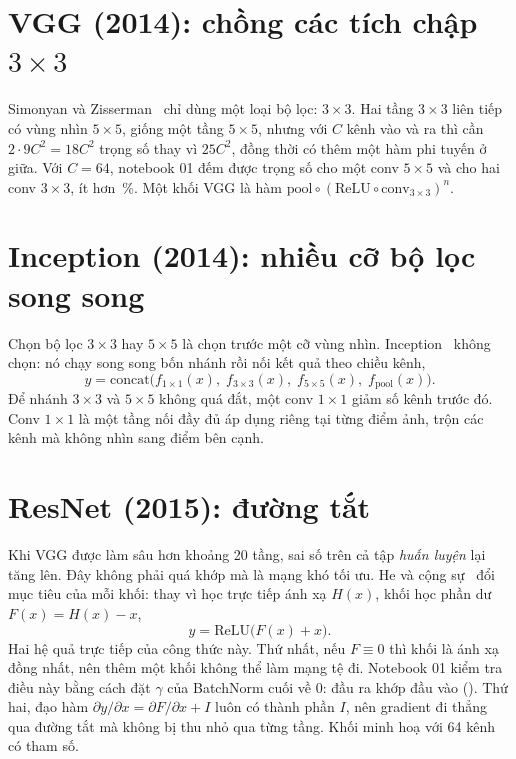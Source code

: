 
\section{VGG (2014): chồng các tích chập $3\times3$}

Simonyan và Zisserman~\cite{simonyan2015} chỉ dùng một loại bộ lọc: $3\times3$. Hai tầng $3\times3$ liên tiếp
có vùng nhìn $5\times5$, giống một tầng $5\times5$, nhưng với $C$ kênh vào và ra thì cần $2\cdot9C^2=18C^2$
trọng số thay vì $25C^2$, đồng thời có thêm một hàm phi tuyến ở giữa. Với $C=64$, notebook 01 đếm được
 trọng số cho một conv $5\times5$ và  cho hai conv $3\times3$,
ít hơn \,\%. Một khối VGG là hàm
$\mathrm{pool}\circ(\mathrm{ReLU}\circ\mathrm{conv}_{3\times3})^{n}$.


\section{Inception (2014): nhiều cỡ bộ lọc song song}

Chọn bộ lọc $3\times3$ hay $5\times5$ là chọn trước một cỡ vùng nhìn. Inception~\cite{szegedy2015} không chọn:
nó chạy song song bốn nhánh rồi nối kết quả theo chiều kênh,
\[
  y = \mathrm{concat}\bigl(f_{1\times1}(x),\; f_{3\times3}(x),\; f_{5\times5}(x),\; f_{\mathrm{pool}}(x)\bigr).
\]
Để nhánh $3\times3$ và $5\times5$ không quá đắt, một conv $1\times1$ giảm số kênh trước đó. Conv $1\times1$ là một
tầng nối đầy đủ áp dụng riêng tại từng điểm ảnh, trộn các kênh mà không nhìn sang điểm bên cạnh.


\section{ResNet (2015): đường tắt}

Khi VGG được làm sâu hơn khoảng 20 tầng, sai số trên cả tập \emph{huấn luyện} lại tăng lên. Đây không phải
quá khớp mà là mạng khó tối ưu. He và cộng sự~\cite{he2016} đổi mục tiêu của mỗi khối: thay vì học trực tiếp
ánh xạ $H(x)$, khối học phần dư $F(x) = H(x) - x$,
\[
  y = \mathrm{ReLU}\bigl(F(x) + x\bigr).
\]
Hai hệ quả trực tiếp của công thức này. Thứ nhất, nếu $F\equiv0$ thì khối là ánh xạ đồng nhất, nên thêm một khối
không thể làm mạng tệ đi. Notebook 01 kiểm tra điều này bằng cách đặt $\gamma$ của BatchNorm cuối về 0:
đầu ra khớp đầu vào (). Thứ hai, đạo hàm
$\partial y/\partial x = \partial F/\partial x + I$ luôn có thành phần $I$, nên gradient đi thẳng qua đường tắt
mà không bị thu nhỏ qua từng tầng. Khối minh hoạ với 64 kênh có  tham số.

